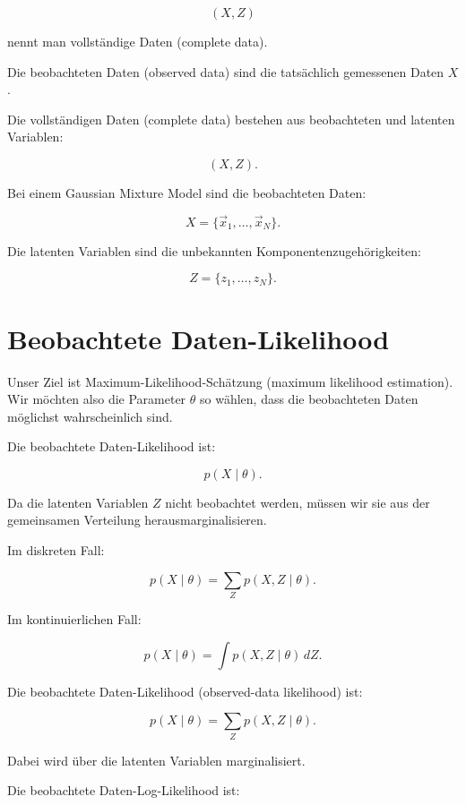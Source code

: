 \[
    (X,Z)
\]

nennt man vollständige Daten (complete data).

\begin{definitionbox}
Die beobachteten Daten (observed data) sind die tatsächlich gemessenen Daten \(X\).

Die vollständigen Daten (complete data) bestehen aus beobachteten und latenten Variablen:

\[
    (X,Z).
\]
\end{definitionbox}

Bei einem Gaussian Mixture Model sind die beobachteten Daten:

\[
    X
    =
    \{\vec{x}_1,\dots,\vec{x}_N\}.
\]

Die latenten Variablen sind die unbekannten Komponentenzugehörigkeiten:

\[
    Z
    =
    \{z_1,\dots,z_N\}.
\]

\section{Beobachtete Daten-Likelihood}

Unser Ziel ist Maximum-Likelihood-Schätzung (maximum likelihood estimation).
Wir möchten also die Parameter \(\theta\) so wählen, dass die beobachteten Daten möglichst wahrscheinlich sind.

Die beobachtete Daten-Likelihood ist:

\[
    p(X\mid\theta).
\]

Da die latenten Variablen \(Z\) nicht beobachtet werden, müssen wir sie aus der gemeinsamen Verteilung herausmarginalisieren.

Im diskreten Fall:

\[
    p(X\mid\theta)
    =
    \sum_Z
    p(X,Z\mid\theta).
\]

Im kontinuierlichen Fall:

\[
    p(X\mid\theta)
    =
    \int
    p(X,Z\mid\theta)
    \,dZ.
\]

\begin{definitionbox}
Die beobachtete Daten-Likelihood (observed-data likelihood) ist:

\[
    p(X\mid\theta)
    =
    \sum_Z
    p(X,Z\mid\theta).
\]

Dabei wird über die latenten Variablen marginalisiert.
\end{definitionbox}

Die beobachtete Daten-Log-Likelihood ist:

